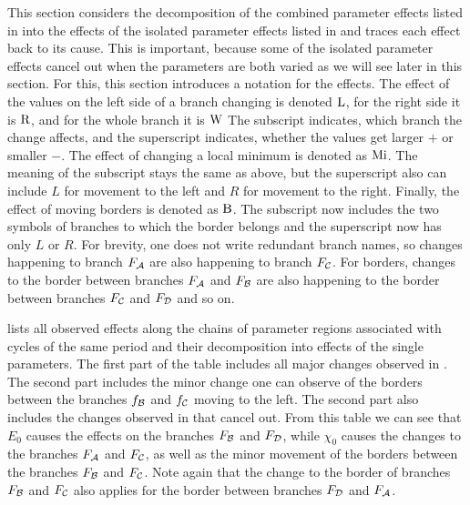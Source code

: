 This section considers the decomposition of the combined parameter effects listed in  into the effects of the isolated parameter effects listed in  and traces each effect back to its cause.
This is important, because some of the isolated parameter effects cancel out when the parameters are both varied as we will see later in this section.
For this, this section introduces a notation for the effects.
The effect of the values on the left side of a branch changing is denoted $\operatorname{L}$, for the right side it is $\operatorname{R}$, and for the whole branch it is $\operatorname{W}$
The subscript indicates, which branch the change affects, and the superscript indicates, whether the values get larger $+$ or smaller $-$.
The effect of changing a local minimum is denoted as $\operatorname{Mi}$.
The meaning of the subscript stays the same as above, but the superscript also can include $L$ for movement to the left and $R$ for movement to the right.
Finally, the effect of moving borders is denoted as $\operatorname{B}$.
The subscript now includes the two symbols of branches to which the border belongs and the superscript now has only $L$ or $R$.
For brevity, one does not write redundant branch names, so changes happening to branch $F_{\mathcal{A}}$ are also happening to branch $F_{\mathcal{C}}$.
For borders, changes to the border between branches $F_{\mathcal{A}}$ and $F_{\mathcal{B}}$ are also happening to the border between branches $F_{\mathcal{C}}$ and $F_{\mathcal{D}}$ and so on.

 lists all observed effects along the chains of parameter regions associated with cycles of the same period and their decomposition into effects of the single parameters.
The first part of the table includes all major changes observed in .
The second part includes the minor change one can observe of the borders between the branches $f_{\mathcal{B}}$ and $f_{\mathcal{C}}$ moving to the left.
The second part also includes the changes observed in  that cancel out.
From this table we can see that $E_0$ causes the effects on the branches $F_{\mathcal{B}}$ and $F_{\mathcal{D}}$, while $\chi_0$ causes the changes to the branches $F_{\mathcal{A}}$ and $F_{\mathcal{C}}$, as well as the minor movement of the borders between the branches $F_{\mathcal{B}}$ and $F_{\mathcal{C}}$.
Note again that the change to the border of branches $F_{\mathcal{B}}$ and $F_{\mathcal{C}}$ also applies for the border between branches $F_{\mathcal{D}}$ and $F_{\mathcal{A}}$.

